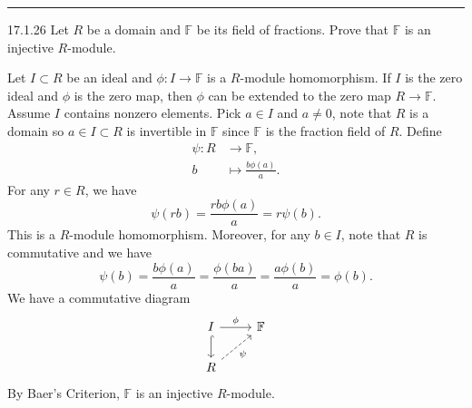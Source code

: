 \documentclass[a4paper, 12pt]{article}
\begin{document}
\noindent\rule{7in}{2.8pt}
\begin{problem}{17.1.26}
Let \(R\) be a domain and \(\mathbb{F}\) be its field of fractions. Prove that \(\mathbb{F}\) is an injective \(R\)-module.
\end{problem}
\begin{solution}
Let \(I\subset R\) be an ideal and \(\phi:I\rightarrow \mathbb{F}\) is a \(R\)-module homomorphism. If \(I\) is the zero ideal and \(\phi\) is the zero map, then \(\phi\) can be extended to the zero map 
\(R\rightarrow \mathbb{F}\). Assume \(I\) contains nonzero elements. Pick \(a\in I\) and \(a\neq 0\), note that \(R\) is a domain so \(a\in I\subset R\) is invertible in \(\mathbb{F}\) since \(\mathbb{F}\) is the fraction field of \(R\). Define 
\begin{align*}
    \psi:R&\rightarrow \mathbb{F},\\ 
         b&\mapsto \frac{b\phi(a)}{a}.
\end{align*}
For any \(r\in R\), we have 
\[\psi(rb)=\frac{rb\phi(a)}{a}=r\psi(b).\]
This is a \(R\)-module homomorphism. Moreover, for any \(b\in I\), note that \(R\) is commutative and we have 
\[\psi(b)=\frac{b\phi(a)}{a}=\frac{\phi(ba)}{a}=\frac{a\phi(b)}{a}=\phi(b).\]
We have a commutative diagram 
\[\begin{tikzcd}
	I & {\mathbb{F}} \\
	R
	\arrow["\phi", from=1-1, to=1-2]
	\arrow[hook, from=1-1, to=2-1]
	\arrow["\psi"', dashed, from=2-1, to=1-2]
\end{tikzcd}\]
By Baer's Criterion, \(\mathbb{F}\) is an injective \(R\)-module. 
\end{solution}
\end{document}
